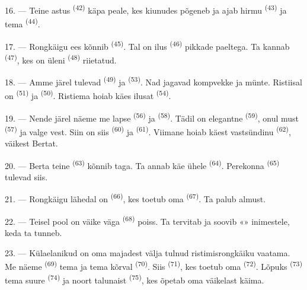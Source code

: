 16. --- Teine astus  \textsuperscript{(42)} käpa peale, kes kiunudes
põgeneb ja ajab hirmu  \textsuperscript{(43)} ja tema 
\textsuperscript{(44)}.

\VUsaut{5.0mm}
\VUsaut{4.0mm}

17. --- Rongkäigu ees kõnnib  \textsuperscript{(45)}. Tal on ilus
 \textsuperscript{(46)} pikkade paeltega. Ta kannab 
\textsuperscript{(47)}, kes on üleni  \textsuperscript{(48)}
riietatud.

18. --- Amme järel tulevad  \textsuperscript{(49)} ja
 \textsuperscript{(53)}. Nad jagavad kompvekke ja münte. Ristiisal on
 \textsuperscript{(51)} ja  \textsuperscript{(50)}.
Ristiema hoiab käes ilusat  \textsuperscript{(54)}.

19. --- Nende järel näeme me lapse  \textsuperscript{(56)} ja
 \textsuperscript{(58)}. Tädil on elegantne 
\textsuperscript{(59)}, onul must  \textsuperscript{(57)} ja valge vest.
Siin on siis  \textsuperscript{(60)} ja 
\textsuperscript{(61)}. Viimane hoiab käest vastsündinu 
\textsuperscript{(62)}, väikest Bertat.

20. --- Berta teine  \textsuperscript{(63)} kõnnib taga. Ta annab käe ühele
 \textsuperscript{(64)}. Perekonna 
\textsuperscript{(65)} tulevad siis.

\VUsaut{4.6mm}
\VUsaut{3.4mm}

21. --- Rongkäigu lähedal on  \textsuperscript{(66)}, kes toetub oma
 \textsuperscript{(67)}. Ta palub almust.

22. --- Teisel pool on väike väga  \textsuperscript{(68)} poiss. Ta
tervitab ja soovib «» inimestele, keda ta tunneb.

23. --- Külaelanikud on oma majadest välja tulnud ristimisrongkäiku vaatama. Me näeme
 \textsuperscript{(69)} tema  ja tema kõrval
 \textsuperscript{(70)}. Siis  \textsuperscript{(71)},
kes toetub oma  \textsuperscript{(72)}. Lõpuks 
\textsuperscript{(73)} tema suure  \textsuperscript{(74)} ja noort
talunaist  \textsuperscript{(75)}, kes õpetab oma väikelast käima.

